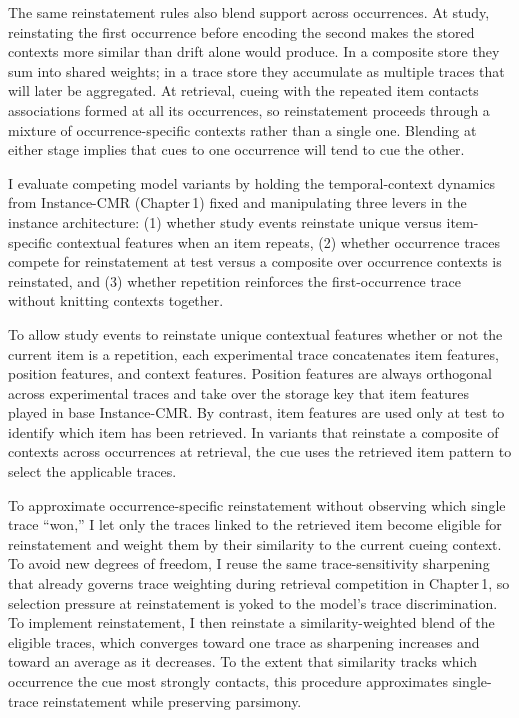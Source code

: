 \documentclass[
  letterpaper,
  11pt,
  english,
  singlespacing,
  headsepline]{MastersDoctoralThesis}
\begin{document}
The same reinstatement rules also blend support across occurrences. At
study, reinstating the first occurrence before encoding the second makes
the stored contexts more similar than drift alone would produce. In a
composite store they sum into shared weights; in a trace store they
accumulate as multiple traces that will later be aggregated. At
retrieval, cueing with the repeated item contacts associations formed at
all its occurrences, so reinstatement proceeds through a mixture of
occurrence-specific contexts rather than a single one. Blending at
either stage implies that cues to one occurrence will tend to cue the
other.

I evaluate competing model variants by holding the temporal-context
dynamics from Instance-CMR (Chapter\,1) fixed and manipulating three
levers in the instance architecture: (1) whether study events reinstate
unique versus item-specific contextual features when an item repeats,
(2) whether occurrence traces compete for reinstatement at test versus a
composite over occurrence contexts is reinstated, and (3) whether
repetition reinforces the first-occurrence trace without knitting
contexts together.

To allow study events to reinstate unique contextual features whether or
not the current item is a repetition, each experimental trace
concatenates item features, position features, and context features.
Position features are always orthogonal across experimental traces and
take over the storage key that item features played in base
Instance-CMR. By contrast, item features are used only at test to
identify which item has been retrieved. In variants that reinstate a
composite of contexts across occurrences at retrieval, the cue uses the
retrieved item pattern to select the applicable traces.

To approximate occurrence-specific reinstatement without observing which
single trace ``won,'' I let only the traces linked to the retrieved item
become eligible for reinstatement and weight them by their similarity to
the current cueing context. To avoid new degrees of freedom, I reuse the
same trace-sensitivity sharpening that already governs trace weighting
during retrieval competition in Chapter\,1, so selection pressure at
reinstatement is yoked to the model's trace discrimination. To implement
reinstatement, I then reinstate a similarity-weighted blend of the
eligible traces, which converges toward one trace as sharpening
increases and toward an average as it decreases. To the extent that
similarity tracks which occurrence the cue most strongly contacts, this
procedure approximates single-trace reinstatement while preserving
parsimony.
\end{document}
